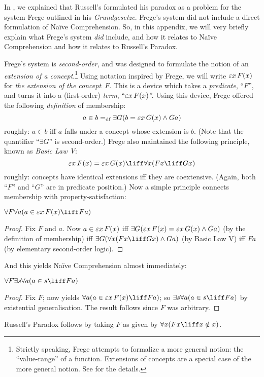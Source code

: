 \documentclass[../../../include/open-logic-section]{subfiles}
\begin{document}


In , we explained that Russell's formulated his
paradox as a problem for the system Frege outlined in his
\emph{Grundgesetze}. Frege's system did not include a direct
formulation of Na\"{i}ve Comprehension. So, in this appendix, we will
very briefly explain what Frege's system \emph{did} include, and how
it relates to Na\"ive Comprehension and how it relates to Russell's
Paradox.

Frege's system is \emph{second-order}, and was designed to formulate
the notion of an \emph{extension of a concept}.\footnote{Strictly
speaking, Frege attempts to formalize a more general notion: the
``value-range'' of a function. Extensions of concepts are a special
case of the more general notion. See \citet[pp.\ 8--9]{Heck2012} for
the details.} Using notation inspired by Frege, we will write
$\fregeext{x}{F(x)}$ for \emph{the extension of the concept~$F$}. This
is a device which takes a \emph{predicate}, ``$F$'', and turns it into
a (first-order) \emph{term}, ``$\fregeext{x}{F(x)}$''. Using this
device, Frege offered the following \emph{definition} of membership:
\[
	a \in b =_\text{df} \exists G(b = \fregeext{x}{G(x)} \land Ga)
\]
roughly: $a \in b$ iff $a$ falls under a concept whose extension is
$b$. (Note that the quantifier ``$\exists G$'' is second-order.) Frege
also maintained the following principle, known as \emph{Basic Law V}: 
$$\fregeext{x}{F(x)} = \fregeext{x}{G(x)} \liff \forall x (Fx \liff Gx)$$
roughly: concepts have identical extensions iff they are coextensive. (Again, both ``$F$'' and ``$G$'' are in predicate position.) Now a simple principle connects membership with property-satisfaction:

\begin{lem}
$\forall F \forall a(a \in \fregeext{x}{F(x)} \liff Fa)$
\end{lem}

\begin{proof} 
Fix $F$ and $a$. Now $a \in \fregeext{x}{F(x)}$ iff $\exists G(\fregeext{x}{F(x)}
= \fregeext{x}{G(x)} \land Ga)$ (by the definition of membership) iff
$\exists G(\forall x(Fx \liff Gx) \land Ga)$ (by Basic Law V) iff $Fa$
(by elementary second-order logic).
\end{proof}

And this yields Na\"ive Comprehension almost immediately:

\begin{lem}
$\forall F \exists s \forall a (a \in s \liff Fa)$
\end{lem}

\begin{proof}
Fix $F$; now  yields $\forall a (a \in
\fregeext{x}{F(x)} \liff Fa)$; so $\exists s\forall a(a \in s \liff Fa)$ by
existential generalisation. The result follows since $F$ was
arbitrary.
\end{proof}

Russell's Paradox follows by taking $F$ as given by $\forall x(Fx \liff x \notin x)$. 
\end{document}
